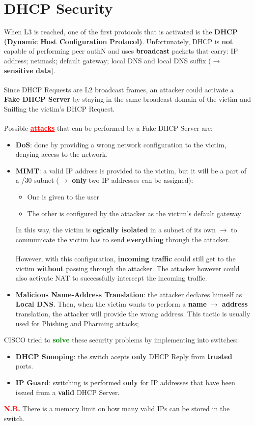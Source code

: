 \section{DHCP Security}
When L3 is reached, one of the first protocols that is activated is the \textbf{DHCP (Dynamic Host Configuration Protocol)}. Unfortunately, DHCP is \textbf{not} capable of performing peer authN
and uses \textbf{broadcast} packets that carry: IP address; netmask; default gateway; local DNS and local DNS suffix (\(\rightarrow \) \textbf{sensitive data}).\\   
\\    
Since DHCP Requests are L2 broadcast frames, an attacker could activate a \textbf{Fake DHCP
Server} by staying in the same broadcast domain of the victim and Sniffing the victim’s DHCP Request.\\    
\\    
Possible \textcolor{red}{\underline{\textbf{attacks}}} that can be performed by a Fake DHCP Server are:
\begin{itemize}
    \item \textbf{DoS}: done by providing a wrong network configuration to the victim, denying access to the network.
    \item \textbf{MIMT}:  a valid IP address is provided to the victim, but it will be a part of a /30 subnet (\(\rightarrow \) \textbf{only} two IP addresses can be assigned):
    \begin{itemize}
        \item One is given to the user
        \item The other is configured by the attacker as the victim’s default gateway
    \end{itemize}
    In this way, the victim is \textbf{ogically isolated} in a subnet of its own \(\rightarrow \) to communicate the victim has to send \textbf{everything} through the attacker.\\   
    \\
However, with this configuration, \textbf{incoming traffic} could still get to the victim \textbf{without} passing through the attacker. The attacker however could also activate NAT to successfully intercept the incoming traffic.
\item \textbf{Malicious Name-Address Translation}: the attacker declares himself as \textbf{Local DNS}. Then, when the victim wants to perform a \textbf{name} \(\rightarrow \) \textbf{address} translation, the attacker
will provide the wrong address. This tactic is usually used for Phishing and Pharming attacks;
\end{itemize}
CISCO tried to \textcolor{green}{\textbf{solve}} these security problems by implementing into switches: 
\begin{itemize}
    \item \textbf{DHCP Snooping}: the switch acepts \textbf{only} DHCP Reply from \textbf{trusted} ports.
    \item \textbf{IP Guard}: switching is performed \textbf{only} for IP addresses that have been issued from a
    \textbf{valid} DHCP Server.
\end{itemize}
\textcolor{red}{\textbf{N.B.}} There is a memory limit on how many valid IPs can be stored in the switch.
